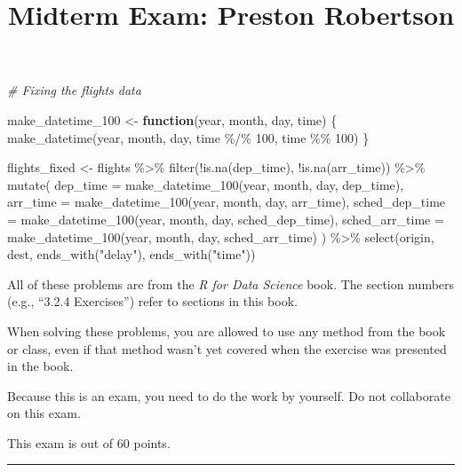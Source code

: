 \documentclass[
]{article}
\title{Midterm Exam: Preston Robertson}
\author{}
\date{\vspace{-2.5em}}
\newenvironment{Shaded}{\begin{snugshade}}{\end{snugshade}}
\newcommand{\AttributeTok}[1]{\textcolor[rgb]{0.77,0.63,0.00}{#1}}
\newcommand{\CommentTok}[1]{\textcolor[rgb]{0.56,0.35,0.01}{\textit{#1}}}
\newcommand{\ControlFlowTok}[1]{\textcolor[rgb]{0.13,0.29,0.53}{\textbf{#1}}}
\newcommand{\DecValTok}[1]{\textcolor[rgb]{0.00,0.00,0.81}{#1}}
\newcommand{\FunctionTok}[1]{\textcolor[rgb]{0.00,0.00,0.00}{#1}}
\newcommand{\NormalTok}[1]{#1}
\newcommand{\OtherTok}[1]{\textcolor[rgb]{0.56,0.35,0.01}{#1}}
\newcommand{\SpecialCharTok}[1]{\textcolor[rgb]{0.00,0.00,0.00}{#1}}
\newcommand{\StringTok}[1]{\textcolor[rgb]{0.31,0.60,0.02}{#1}}
\begin{document}
\maketitle

\begin{Shaded}
\begin{Highlighting}[]
\CommentTok{\# Fixing the flights data}

\NormalTok{make\_datetime\_100 }\OtherTok{\textless{}{-}} \ControlFlowTok{function}\NormalTok{(year, month, day, time) \{}
  \FunctionTok{make\_datetime}\NormalTok{(year, month, day, time }\SpecialCharTok{\%/\%} \DecValTok{100}\NormalTok{, time }\SpecialCharTok{\%\%} \DecValTok{100}\NormalTok{)}
\NormalTok{\}}


\NormalTok{flights\_fixed }\OtherTok{\textless{}{-}}\NormalTok{ flights }\SpecialCharTok{\%\textgreater{}\%}
  \FunctionTok{filter}\NormalTok{(}\SpecialCharTok{!}\FunctionTok{is.na}\NormalTok{(dep\_time), }\SpecialCharTok{!}\FunctionTok{is.na}\NormalTok{(arr\_time)) }\SpecialCharTok{\%\textgreater{}\%}
  \FunctionTok{mutate}\NormalTok{(}
    \AttributeTok{dep\_time =} \FunctionTok{make\_datetime\_100}\NormalTok{(year, month, day, dep\_time),}
    \AttributeTok{arr\_time =} \FunctionTok{make\_datetime\_100}\NormalTok{(year, month, day, arr\_time),}
    \AttributeTok{sched\_dep\_time =} \FunctionTok{make\_datetime\_100}\NormalTok{(year, month, day, sched\_dep\_time),}
    \AttributeTok{sched\_arr\_time =} \FunctionTok{make\_datetime\_100}\NormalTok{(year, month, day, sched\_arr\_time)}
\NormalTok{  ) }\SpecialCharTok{\%\textgreater{}\%}
  \FunctionTok{select}\NormalTok{(origin, dest, }\FunctionTok{ends\_with}\NormalTok{(}\StringTok{"delay"}\NormalTok{), }\FunctionTok{ends\_with}\NormalTok{(}\StringTok{"time"}\NormalTok{))}
\end{Highlighting}
\end{Shaded}

All of these problems are from the \emph{R for Data Science} book. The
section numbers (e.g., ``3.2.4 Exercises'') refer to sections in this
book.

When solving these problems, you are allowed to use any method from the
book or class, even if that method wasn't yet covered when the exercise
was presented in the book.

Because this is an exam, you need to do the work by yourself. Do not
collaborate on this exam.

This exam is out of 60 points.

\begin{center}\rule{0.5\linewidth}{0.5pt}\end{center}
\end{document}
